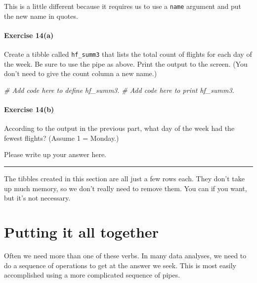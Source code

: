 \documentclass[
]{book}
\newenvironment{Shaded}{\begin{snugshade}}{\end{snugshade}}
\newcommand{\CommentTok}[1]{\textcolor[rgb]{0.56,0.35,0.01}{\textit{#1}}}
\begin{document}
This is a little different because it requires us to use a \texttt{name} argument and put the new name in quotes.

\hypertarget{exercise-14a}{%
\paragraph*{Exercise 14(a)}\label{exercise-14a}}

Create a tibble called \texttt{hf\_summ3} that lists the total count of flights for each day of the week. Be sure to use the pipe as above. Print the output to the screen. (You don't need to give the count column a new name.)

\begin{Shaded}
\begin{Highlighting}[]
\CommentTok{\# Add code here to define hf\_summ3.}
\CommentTok{\# Add code here to print hf\_summ3.}
\end{Highlighting}
\end{Shaded}

\hypertarget{exercise-14b}{%
\paragraph*{Exercise 14(b)}\label{exercise-14b}}

According to the output in the previous part, what day of the week had the fewest flights? (Assume 1 = Monday.)

Please write up your answer here.

\begin{center}\rule{0.5\linewidth}{0.5pt}\end{center}

The tibbles created in this section are all just a few rows each. They don't take up much memory, so we don't really need to remove them. You can if you want, but it's not necessary.

\hypertarget{manipulating-all-together}{%
\section{Putting it all together}\label{manipulating-all-together}}

Often we need more than one of these verbs. In many data analyses, we need to do a sequence of operations to get at the answer we seek. This is most easily accomplished using a more complicated sequence of pipes.
\end{document}
